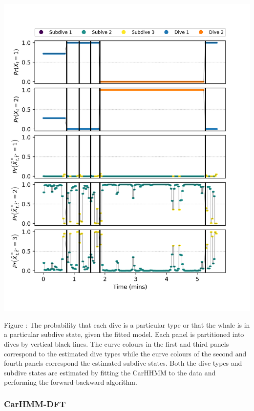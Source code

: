 \documentclass{article}
\begin{document}
        \begin{center}
        \includegraphics[width=6in]{../Plots/CarHHMM1_decoded_states.png}
        \end{center}
        
        \noindent Figure : The probability that each dive is a particular type or that the whale is in a particular subdive state, given the fitted model. Each panel is partitioned into dives by vertical black lines. The curve colours in the first and third panels correspond to the estimated dive types while the curve colours of the second and fourth panels correspond the estimated subdive states. Both the dive types and subdive states are estimated by fitting the CarHHMM to the data and performing the forward-backward algorithm.
        \addtocounter{fignum}{1}
        
        \subsubsection{CarHMM-DFT}
        
\end{document}
